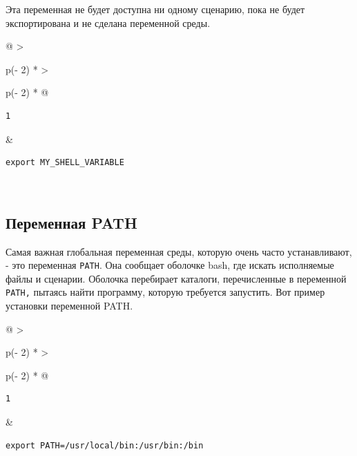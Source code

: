 \documentclass{report}
\begin{document}
Эта переменная не будет доступна ни одному сценарию, пока не будет
экспортирована и не сделана переменной среды.

\begin{longtable}[]{@{}
  >{\raggedright\arraybackslash}p{(\columnwidth - 2\tabcolsep) * }
  >{\raggedright\arraybackslash}p{(\columnwidth - 2\tabcolsep) * }@{}}
\toprule
\endhead
\begin{minipage}[t]{\linewidth}\raggedright
\begin{verbatim}
1
\end{verbatim}
\end{minipage} & \begin{minipage}[t]{\linewidth}\raggedright
\begin{verbatim}
export MY_SHELL_VARIABLE
\end{verbatim}
\end{minipage} \\ \addlinespace
\bottomrule
\end{longtable}

\hypertarget{PATH-variable}{%
\subsection{\texorpdfstring{\protect\hyperlink{PATH-variable}{}Переменная
PATH}{Переменная PATH}}\label{PATH-variable}}

Самая важная глобальная переменная среды, которую очень часто
устанавливают, - это переменная \texttt{PATH}. Она сообщает оболочке
bash, где искать исполняемые файлы и сценарии. Оболочка перебирает
каталоги, перечисленные в переменной \texttt{PATH,} пытаясь найти
программу, которую требуется запустить. Вот пример установки переменной
PATH.

\begin{longtable}[]{@{}
  >{\raggedright\arraybackslash}p{(\columnwidth - 2\tabcolsep) * }
  >{\raggedright\arraybackslash}p{(\columnwidth - 2\tabcolsep) * }@{}}
\toprule
\endhead
\begin{minipage}[t]{\linewidth}\raggedright
\begin{verbatim}
1
\end{verbatim}
\end{minipage} & \begin{minipage}[t]{\linewidth}\raggedright
\begin{verbatim}
export PATH=/usr/local/bin:/usr/bin:/bin
\end{verbatim}
\end{minipage} \\ \addlinespace
\bottomrule
\end{longtable}
\end{document}

